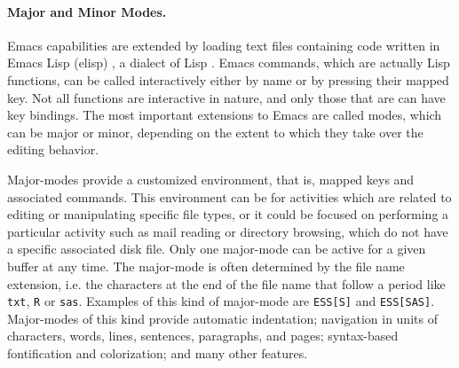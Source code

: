 \documentclass{article}
\newcommand{\stexttt}[1]{{\small\texttt{#1}}}
\begin{document}
\paragraph{Major and Minor Modes.}
\label{sec:modes}
Emacs capabilities are extended by loading text files containing code
written in Emacs Lisp (elisp) \citep{RChassell1999}, a dialect of Lisp
\citep{PGraham:1996}.  Emacs commands, which are actually Lisp
functions, can be called interactively either by name or by pressing
their mapped key.  Not all functions are interactive in nature, and
only those that are can have key bindings.  The most important
extensions to Emacs are called modes, which can be major or minor,
depending on the extent to which they take over the editing behavior.

Major-modes provide a %
customized environment, that is, mapped keys and associated commands.
This environment can be for activities which are related to editing or
manipulating specific file types, or it could be focused on performing
a particular activity such as mail reading or directory browsing,
which do not have a specific associated disk file.  Only one
major-mode can be active for a given buffer at any time.  The
major-mode is often determined by the file name extension, i.e. the
characters at the end of the file name that follow a period like
\stexttt{txt}, \stexttt{R} or \stexttt{sas}.  Examples of this kind of
major-mode are \stexttt{ESS[S]} and \stexttt{ESS[SAS]}.
Major-modes of this kind provide automatic indentation; navigation in
units of characters, words, lines, sentences, paragraphs, and pages;
syntax-based fontification and colorization; and many other features.

\end{document}
